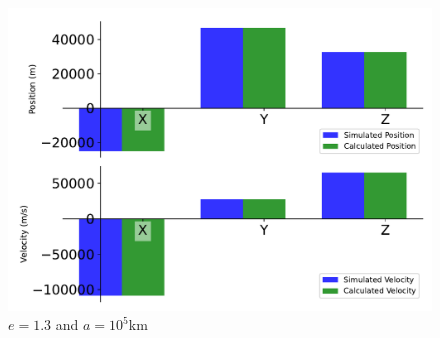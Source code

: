 \begin{figure}[htbp]\centerline{\includegraphics[height=0.7\textwidth, keepaspectratio]{AutoTeX/IncHyp_a_2}}\caption{$e = 1.3$ and $a = 10^5$km}\label{fig:IncHyp_a_2}\end{figure}